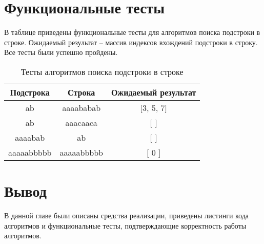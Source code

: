 \clearpage






\section{Функциональные тесты}

В таблице приведены функциональные тесты для алгоритмов поиска подстроки в строке. Ожидаемый результат -- массив индексов вхождений подстроки в строку.
Все тесты были успешно пройдены.

\clearpage

\begin{table}
	\caption{Тесты алгоритмов поиска подстроки в строке}
	\begin{center}
	\begin{tabular}[c]{|c|c|c|}
		\hline
		Подстрока & Строка & Ожидаемый результат \\
		\hline
		ab & aaaababab & [3, 5, 7] \\\hline
		ab & aaacaaca & [ ] \\\hline
		aaaabab & ab & [ ] \\\hline
		aaaaabbbbb & aaaaabbbbb & [ 0 ] \\\hline

	\end{tabular}
\end{center}
	\end{table}

\section*{Вывод}

В данной главе были описаны средства реализации, приведены листинги кода алгоритмов и функциональные тесты, подтверждающие корректность работы алгоритмов.
